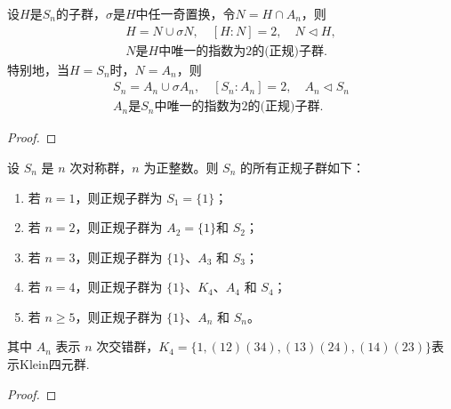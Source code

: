 \documentclass[../../main.tex]{subfiles}%
\begin{document}
\begin{proposition}\label{proposition:Sn的分解和An是Sn的正规子群}
设$H$是$S_n$的子群，$\sigma$是$H$中任一奇置换，令$N=H\cap A_n$，则\begin{align*}
H=N\cup \sigma N,\quad [H:N]=2,\quad N\lhd H,\\
N\text{是}H\text{中唯一的指数为}2\text{的(正规)子群}.
\end{align*}
特别地，当$H=S_n$时，$N=A_n$，则\begin{align*}
S_n=A_n\cup \sigma A_n,\quad [S_n:A_n]=2,\quad A_n\lhd S_n\\
A_n\text{是}S_n\text{中唯一的指数为}2\text{的(正规)子群}.
\end{align*}
\end{proposition}
\begin{proof}



\end{proof}

\begin{proposition}\label{proposition:对称群正规子群的分类}
设 \(S_n\) 是 \(n\) 次对称群，\(n\) 为正整数。则 \(S_n\) 的所有正规子群如下：
\begin{enumerate}[(1)]
\item 若 \(n = 1\)，则正规子群为 \(S_1=\{1\}\)；

\item 若 \(n = 2\)，则正规子群为 \(A_2=\{1\}\)和 \(S_2\)；

\item 若 \(n = 3\)，则正规子群为 \(\{1\}\)、\(A_3\) 和 \(S_3\)；

\item 若 \(n = 4\)，则正规子群为 \(\{1\}\)、\(K_4\)、\(A_4\) 和 \(S_4\)；

\item 若 \(n \geqslant 5\)，则正规子群为 \(\{1\}\)、\(A_n\) 和 \(S_n\)。
\end{enumerate}
其中 \(A_n\) 表示 \(n\) 次交错群，\(K_4 = \{1, (12)(34), (13)(24), (14)(23)\}\)表示Klein四元群.
\end{proposition}
\begin{proof}



\end{proof}
\end{document}
